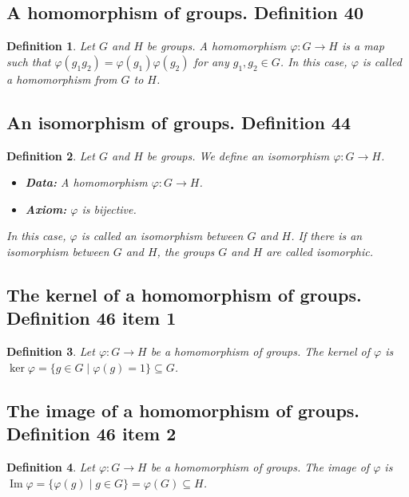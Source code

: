 \documentclass{article}
\newtheorem*{customdefinition}{Definition}
\begin{document}
\subsection*{A homomorphism of groups. Definition 40}
\begin{customdefinition}
Let \( G \) and \( H \) be groups. A homomorphism \( \varphi : G \rightarrow H \) is a map such that \( \varphi(g_1 g_2) = \varphi(g_1) \varphi(g_2) \) for any \( g_1, g_2 \in G \). In this case, \( \varphi \) is called a homomorphism from \( G \) to \( H \).
\end{customdefinition}

\subsection*{An isomorphism of groups. Definition 44}
\begin{customdefinition}
Let \( G \) and \( H \) be groups. We define an isomorphism \( \varphi : G \rightarrow H \).

\begin{itemize}
    \item \textbf{Data:} A homomorphism \( \varphi : G \rightarrow H \).
    \item \textbf{Axiom:} \( \varphi \) is bijective.
\end{itemize}

In this case, \( \varphi \) is called an isomorphism between \( G \) and \( H \). If there is an isomorphism between \( G \) and \( H \), the groups \( G \) and \( H \) are called isomorphic.
\end{customdefinition}

\subsection*{The kernel of a homomorphism of groups. Definition 46 item 1}
\begin{customdefinition}
Let \( \varphi : G \rightarrow H \) be a homomorphism of groups. The kernel of \( \varphi \) is \( \ker \varphi = \{ g \in G \mid \varphi(g) = 1 \} \subseteq G \).
\end{customdefinition}

\subsection*{The image of a homomorphism of groups. Definition 46 item 2}
\begin{customdefinition}
Let \( \varphi : G \rightarrow H \) be a homomorphism of groups. The image of \( \varphi \) is \( \operatorname{Im} \varphi = \{ \varphi(g) \mid g \in G \} = \varphi(G) \subseteq H \).
\end{customdefinition}
\end{document}
